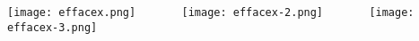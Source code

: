 \documentclass{standalone}
\begin{document}
\texttt{[image: effacex.png]}
$\quad$$\quad$$\quad$
\texttt{[image: effacex-2.png]}
$\quad$$\quad$$\quad$
\texttt{[image: effacex-3.png]}
\end{document}

